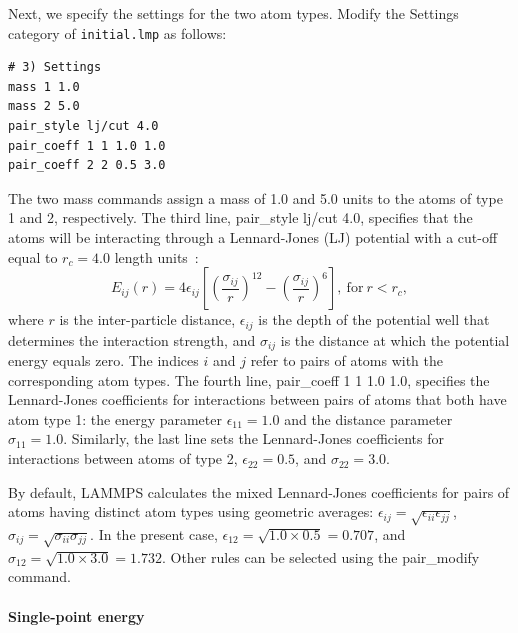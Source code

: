 \documentclass[9pt,tutorial]{livecoms}
\newcommand{\lmpcmd}[1]{\colorbox{listing}{\textcolor{command}{\small{#1}}}} %
\newcommand{\flecmd}[1]{\textcolor{command}{\texttt{#1}}} %
\begin{document}
Next, we specify the settings for the two atom types.  Modify the
\lmpcmd{Settings} category of \flecmd{initial.lmp} as follows:
\begin{lstlisting}
# 3) Settings
mass 1 1.0
mass 2 5.0
pair_style lj/cut 4.0
pair_coeff 1 1 1.0 1.0
pair_coeff 2 2 0.5 3.0
\end{lstlisting}
The two \lmpcmd{mass} commands assign a mass of 1.0 and 5.0 units to the
atoms of type 1 and 2, respectively.  The third line,
\lmpcmd{pair\_style lj/cut 4.0}, specifies that the atoms will be
interacting through a Lennard-Jones (LJ) potential with a cut-off equal
to $r_c = 4.0$ length units~\cite{wang2020lennard,fischer2023history}:
\begin{equation}
E_{ij} (r) = 4 \epsilon_{ij} \left[ \left( \dfrac{\sigma_{ij}}{r} \right)^{12}
  - \left( \dfrac{\sigma_{ij}}{r} \right)^{6} \right], ~ \text{for} ~ r < r_c,
\label{eq:LJ}
\end{equation}
where $r$ is the inter-particle distance, $\epsilon_{ij}$ is the depth
of the potential well that determines the interaction strength, and
$\sigma_{ij}$ is the distance at which the potential energy equals zero.
The indices $i$ and $j$ refer to pairs of atoms with the
corresponding atom types.  The fourth line, \lmpcmd{pair\_coeff 1 1
  1.0 1.0}, specifies the Lennard-Jones coefficients for interactions
between pairs of atoms that both have atom type 1: the
energy parameter $\epsilon_{11} = 1.0$ and the distance parameter
$\sigma_{11} = 1.0$.  Similarly, the last line sets the Lennard-Jones
coefficients for interactions between atoms of type 2,
$\epsilon_{22} = 0.5$, and $\sigma_{22} = 3.0$.

\begin{note}
  By default, LAMMPS calculates the mixed Lennard-Jones
  coefficients for pairs of atoms having distinct atom types using geometric averages:
  $\epsilon_{ij} = \sqrt{\epsilon_{ii} \epsilon_{jj}}$,
  $\sigma_{ij} = \sqrt{\sigma_{ii} \sigma_{jj}}$.  In the present case,
  $\epsilon_{12} = \sqrt{1.0 \times 0.5} = 0.707$, and
  $\sigma_{12} = \sqrt{1.0 \times 3.0} = 1.732$.  Other
  rules can be selected using the \lmpcmd{pair\_modify} command.
\end{note}

\paragraph{Single-point energy}
\end{document}
